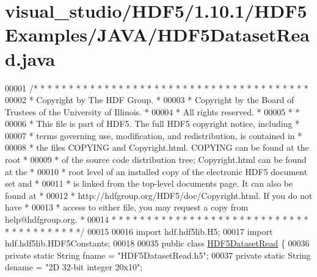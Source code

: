 \hypertarget{visual__studio_2_h_d_f5_21_810_81_2_h_d_f5_examples_2_j_a_v_a_2_h_d_f5_dataset_read_8java_source}{}\section{visual\+\_\+studio/\+H\+D\+F5/1.10.1/\+H\+D\+F5\+Examples/\+J\+A\+V\+A/\+H\+D\+F5\+Dataset\+Read.java}
\label{visual__studio_2_h_d_f5_21_810_81_2_h_d_f5_examples_2_j_a_v_a_2_h_d_f5_dataset_read_8java_source}

\begin{DoxyCode}
00001 \textcolor{comment}{/* * * * * * * * * * * * * * * * * * * * * * * * * * * * * * * * * * * * * * *}
00002 \textcolor{comment}{ * Copyright by The HDF Group.                                               *}
00003 \textcolor{comment}{ * Copyright by the Board of Trustees of the University of Illinois.         *}
00004 \textcolor{comment}{ * All rights reserved.                                                      *}
00005 \textcolor{comment}{ *                                                                           *}
00006 \textcolor{comment}{ * This file is part of HDF5.  The full HDF5 copyright notice, including     *}
00007 \textcolor{comment}{ * terms governing use, modification, and redistribution, is contained in    *}
00008 \textcolor{comment}{ * the files COPYING and Copyright.html.  COPYING can be found at the root   *}
00009 \textcolor{comment}{ * of the source code distribution tree; Copyright.html can be found at the  *}
00010 \textcolor{comment}{ * root level of an installed copy of the electronic HDF5 document set and   *}
00011 \textcolor{comment}{ * is linked from the top-level documents page.  It can also be found at     *}
00012 \textcolor{comment}{ * http://hdfgroup.org/HDF5/doc/Copyright.html.  If you do not have          *}
00013 \textcolor{comment}{ * access to either file, you may request a copy from help@hdfgroup.org.     *}
00014 \textcolor{comment}{ * * * * * * * * * * * * * * * * * * * * * * * * * * * * * * * * * * * * * * */}
00015 
00016 \textcolor{keyword}{import} hdf.hdf5lib.H5;
00017 \textcolor{keyword}{import} hdf.hdf5lib.HDF5Constants;
00018 
00035 \textcolor{keyword}{public} \textcolor{keyword}{class }\hyperlink{class_h_d_f5_dataset_read}{HDF5DatasetRead} \{
00036     \textcolor{keyword}{private} \textcolor{keyword}{static} String fname  = \textcolor{stringliteral}{"HDF5DatasetRead.h5"};
00037     \textcolor{keyword}{private} \textcolor{keyword}{static} String dsname  = \textcolor{stringliteral}{"2D 32-bit integer 20x10"};

\end{DoxyCode}
